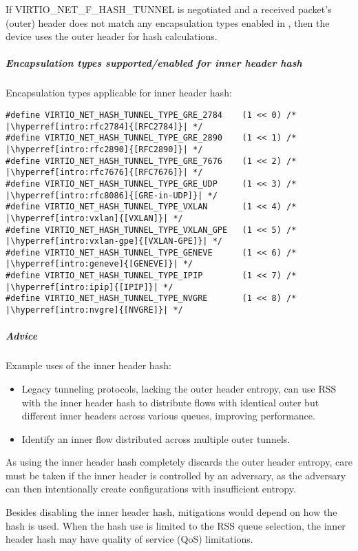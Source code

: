 If VIRTIO_NET_F_HASH_TUNNEL is negotiated and a received packet's (outer) header does not match any encapsulation
types enabled in , then the device uses the outer header for hash calculations.

\subparagraph{Encapsulation types supported/enabled for inner header hash}
\label{sec:Device Types / Network Device / Device Operation / Processing of Incoming Packets /
Hash calculation for incoming packets / Encapsulation types supported/enabled for inner header hash}

Encapsulation types applicable for inner header hash:
\begin{lstlisting}[escapechar=|]
#define VIRTIO_NET_HASH_TUNNEL_TYPE_GRE_2784    (1 << 0) /* |\hyperref[intro:rfc2784]{[RFC2784]}| */
#define VIRTIO_NET_HASH_TUNNEL_TYPE_GRE_2890    (1 << 1) /* |\hyperref[intro:rfc2890]{[RFC2890]}| */
#define VIRTIO_NET_HASH_TUNNEL_TYPE_GRE_7676    (1 << 2) /* |\hyperref[intro:rfc7676]{[RFC7676]}| */
#define VIRTIO_NET_HASH_TUNNEL_TYPE_GRE_UDP     (1 << 3) /* |\hyperref[intro:rfc8086]{[GRE-in-UDP]}| */
#define VIRTIO_NET_HASH_TUNNEL_TYPE_VXLAN       (1 << 4) /* |\hyperref[intro:vxlan]{[VXLAN]}| */
#define VIRTIO_NET_HASH_TUNNEL_TYPE_VXLAN_GPE   (1 << 5) /* |\hyperref[intro:vxlan-gpe]{[VXLAN-GPE]}| */
#define VIRTIO_NET_HASH_TUNNEL_TYPE_GENEVE      (1 << 6) /* |\hyperref[intro:geneve]{[GENEVE]}| */
#define VIRTIO_NET_HASH_TUNNEL_TYPE_IPIP        (1 << 7) /* |\hyperref[intro:ipip]{[IPIP]}| */
#define VIRTIO_NET_HASH_TUNNEL_TYPE_NVGRE       (1 << 8) /* |\hyperref[intro:nvgre]{[NVGRE]}| */
\end{lstlisting}

\subparagraph{Advice}
Example uses of the inner header hash:
\begin{itemize}
\item Legacy tunneling protocols, lacking the outer header entropy, can use RSS with the inner header hash to
      distribute flows with identical outer but different inner headers across various queues, improving performance.
\item Identify an inner flow distributed across multiple outer tunnels.
\end{itemize}

As using the inner header hash completely discards the outer header entropy, care must be taken
if the inner header is controlled by an adversary, as the adversary can then intentionally create
configurations with insufficient entropy.

Besides disabling the inner header hash, mitigations would depend on how the hash is used. When the hash
use is limited to the RSS queue selection, the inner header hash may have quality of service (QoS) limitations.

